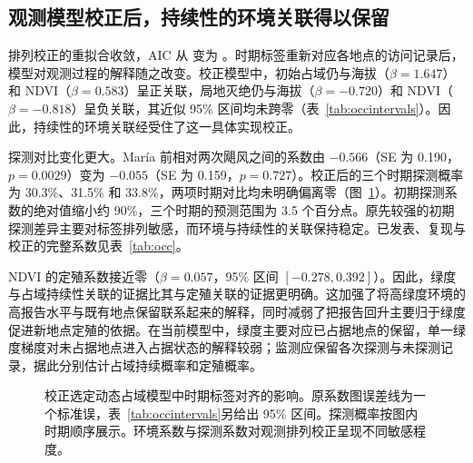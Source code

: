 

\subsection{观测模型校正后，持续性的环境关联得以保留}
排列校正的重拟合收敛，AIC 从 \aicOccPub{} 变为 \aicOccFix{}。时期标签重新对应各地点的访问记录后，模型对观测过程的解释随之改变。校正模型中，初始占域仍与海拔（$\beta=1.647$）和 NDVI（$\beta=0.583$）呈正关联，局地灭绝仍与海拔（$\beta=-0.720$）和 NDVI（$\beta=-0.818$）呈负关联，其近似 95\% 区间均未跨零（表~\ref{tab:occintervals}）。因此，持续性的环境关联经受住了这一具体实现校正。

探测对比变化更大。María 前相对两次飓风之间的系数由 $-0.566$（SE 为 0.190，$p=0.0029$）变为 $-0.055$（SE 为 0.159，$p=0.727$）。校正后的三个时期探测概率为 30.3\%、31.5\% 和 33.8\%，两项时期对比均未明确偏离零（图~\ref{fig:ordering}）。初期探测系数的绝对值缩小约 90\%，三个时期的预测范围为 3.5 个百分点。原先较强的初期探测差异主要对标签排列敏感，而环境与持续性的关联保持稳定。已发表、复现与校正的完整系数见表~\ref{tab:occ}。

NDVI 的定殖系数接近零（$\beta=0.057$，95\% 区间 $[-0.278,0.392]$）。因此，绿度与占域持续性关联的证据比其与定殖关联的证据更明确。这加强了将高绿度环境的高报告水平与既有地点保留联系起来的解释，同时减弱了把报告回升主要归于绿度促进新地点定殖的依据。在当前模型中，绿度主要对应已占据地点的保留，单一绿度梯度对未占据地点进入占据状态的解释较弱；监测应保留各次探测与未探测记录，据此分别估计占域持续概率和定殖概率。
\begin{figure}[htbp]\centering
{}
\caption{校正选定动态占域模型中时期标签对齐的影响。原系数图误差线为一个标准误，表~\ref{tab:occintervals}另给出 95\% 区间。探测概率按图内时期顺序展示。环境系数与探测系数对观测排列校正呈现不同敏感程度。}\label{fig:ordering}
\end{figure}
\FloatBarrier



